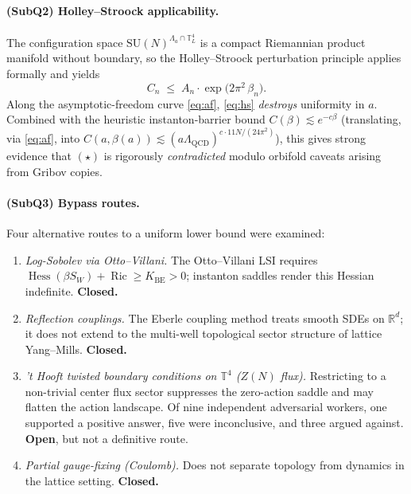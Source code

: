 \documentclass[11pt,a4paper]{amsart}
\theoremstyle{definition}
\theoremstyle{remark}
\DeclareMathOperator{\Hess}{Hess}
\DeclareMathOperator{\Ric}{Ric}
\begin{document}
\paragraph{(SubQ2) Holley--Stroock applicability.} The configuration space $\mathrm{SU}(N)^{\Lambda_a\cap\mathbb{T}^4_L}$ is a compact Riemannian product manifold without boundary, so the Holley--Stroock perturbation principle \cite{HolleyStroock1988} applies formally and yields
\begin{equation}\label{eq:hs}
C_n \;\le\; A_n \cdot \exp\!\bigl(2\pi^2\,\beta_n\bigr).
\end{equation}
Along the asymptotic-freedom curve \eqref{eq:af}, \eqref{eq:hs} \emph{destroys} uniformity in $a$. Combined with the heuristic instanton-barrier bound $C(\beta)\lesssim e^{-c\beta}$ (translating, via \eqref{eq:af}, into $C(a,\beta(a))\lesssim (a\Lambda_{\mathrm{QCD}})^{c\cdot 11N/(24\pi^2)}$), this gives strong evidence that $(\star)$ is rigorously \emph{contradicted} modulo orbifold caveats arising from Gribov copies.

\paragraph{(SubQ3) Bypass routes.} Four alternative routes to a uniform lower bound were examined:
\begin{enumerate}[label=(\alph*),leftmargin=2em]
\item \emph{Log-Sobolev via Otto--Villani.} The Otto--Villani LSI \cite{OttoVillani2000} requires $\Hess(\beta S_W)+\Ric\ge K_{\mathrm{BE}}>0$; instanton saddles render this Hessian indefinite. \textbf{Closed.}
\item \emph{Reflection couplings.} The Eberle coupling method \cite{Eberle2016} treats smooth SDEs on $\mathbb{R}^d$; it does not extend to the multi-well topological sector structure of lattice Yang--Mills. \textbf{Closed.}
\item \emph{'t Hooft twisted boundary conditions on $\mathbb{T}^4$ ($Z(N)$ flux).} Restricting to a non-trivial center flux sector suppresses the zero-action saddle and may flatten the action landscape. Of nine independent adversarial workers, one supported a positive answer, five were inconclusive, and three argued against. \textbf{Open}, but not a definitive route.
\item \emph{Partial gauge-fixing (Coulomb).} Does not separate topology from dynamics in the lattice setting. \textbf{Closed.}
\end{enumerate}
\end{document}
